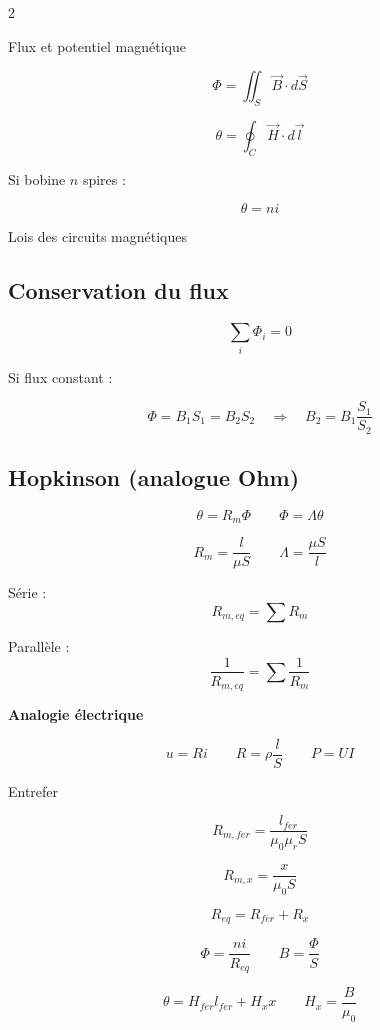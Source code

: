 \documentclass[10pt,a4paper]{article}
\begin{document}
\begin{multicols}{2}
\begin{metbox}{Flux et potentiel magnétique}

\[
\Phi=\iint_S \vec B\cdot d\vec S
\]

\[
\theta=\oint_C \vec H\cdot d\vec l
\]

Si bobine $n$ spires :

\[
\theta = n i
\]

\end{metbox}


\begin{metbox}{Lois des circuits magnétiques}

\subsection*{Conservation du flux}

\[
\sum_i \Phi_i = 0
\]

Si flux constant :

\[
\Phi=B_1S_1=B_2S_2
\quad\Rightarrow\quad
B_2=B_1\frac{S_1}{S_2}
\]

\subsection*{Hopkinson (analogue Ohm)}

\[
\boxed{\theta = R_m \Phi}
\qquad
\boxed{\Phi=\Lambda \theta}
\]

\[
R_m=\frac{l}{\mu S}
\qquad
\Lambda=\frac{\mu S}{l}
\]

Série :
\[
R_{m,eq}=\sum R_m
\]

Parallèle :
\[
\frac{1}{R_{m,eq}}=\sum\frac{1}{R_m}
\]

\medskip
\textbf{Analogie électrique}

\[
u = R i
\qquad
R = \rho \frac{l}{S}
\qquad
P = U I
\]


\end{metbox}

\begin{metbox}{Entrefer}

\[
R_{m,fer}=\frac{l_{fer}}{\mu_0\mu_r S}
\]

\[
R_{m,x}=\frac{x}{\mu_0 S}
\]

\[
R_{eq}=R_{fer}+R_x
\]

\[
\Phi=\frac{n i}{R_{eq}}
\qquad
B=\frac{\Phi}{S}
\]

\[
\theta = H_{fer}l_{fer} + H_x x
\qquad
H_x=\frac{B}{\mu_0}
\]



\end{metbox}
\end{multicols}
\end{document}
